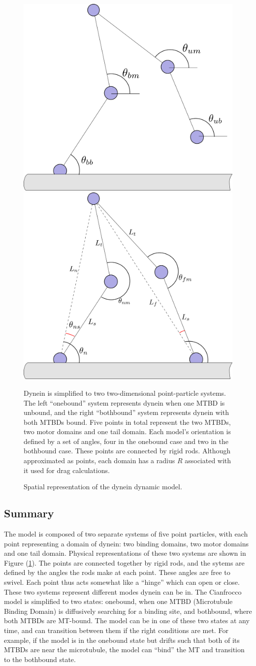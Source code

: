 \documentclass[
11pt, %
english, %
singlespacing, %
headsepline, %
chapterinoneline, %
]{MastersDoctoralThesis} %
\begin{document}
\begin{figure}[h]
  \centering
  \includegraphics[width=.45\textwidth]{../../figures/theory-onebound}
  \includegraphics[width=.45\textwidth]{../../figures/theory-bothbound}
  \caption{Spatial representation of the dynein dynamic model.}{Dynein is simplified to two two-dimensional point-particle systems. The left ``onebound'' system represents dynein when one MTBD is unbound, and the right ``bothbound'' system represents dynein with both MTBDs bound. Five points in total represent the two MTBDs, two motor domains and one tail domain. Each model's orientation is defined by a set of angles, four in the onebound case and two in the bothbound case. These points are connected by rigid rods. Although approximated as points, each domain has a radius $R$ associated with it used for drag calculations.}
  \label{fig:theory-intro}
\end{figure}

\subsection{Summary}
The model is composed of two separate systems of five point particles, with each point representing a domain of dynein: two binding domains, two motor domains and one tail domain. Physical representations of these two systems are shown in Figure (\ref{fig:theory-intro}). The points are connected together by rigid rods, and the sytems are defined by the angles the rods make at each point. These angles are free to swivel. Each point thus acts somewhat like a ``hinge'' which can open or close. These two systems represent different modes dynein can be in. The Cianfrocco model is simplified to two states: onebound, when one MTBD (Microtubule Binding Domain) is diffusively searching for a binding site, and bothbound, where both MTBDs are MT-bound. The model can be in one of these two states at any time, and can transition between them if the right conditions are met. For example, if the model is in the onebound state but drifts such that both of its MTBDs are near the microtubule, the model can ``bind'' the MT and transition to the bothbound state.\\
\end{document}
